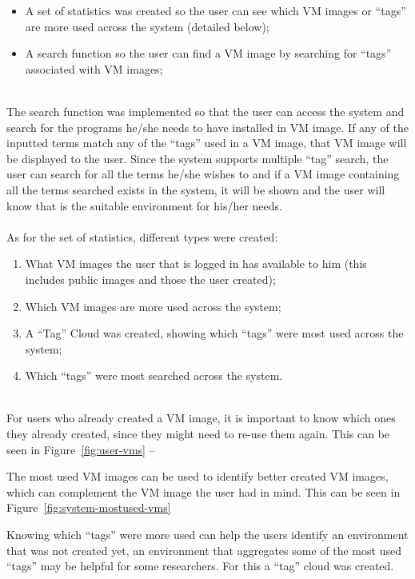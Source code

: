 \begin{itemize}
\item A set of statistics was created so the user can see which VM images or ``tags'' are more used across the system (detailed below);
\item A search function so the user can find a VM image by searching for ``tags'' associated with VM images;
\end{itemize}

\ \\
The search function was implemented so that the user can access the system and search for the programs he/she needs to have installed in VM image. If any of the inputted terms match any of the ``tags'' used in a VM image, that VM image will be displayed to the user. Since the system supports multiple ``tag'' search, the user can search for all the terms he/she wishes to and if a VM image containing all the terms searched exists in the system, it will be shown and the user will know that is the suitable environment for his/her needs.\\
\ \\
As for the set of statistics, different types were created:

\begin{enumerate}
\item What VM images the user that is logged in has available to him (this includes public images and those the user created);
\item Which VM images are more used across the system;
\item A ``Tag'' Cloud was created, showing which ``tags'' were most used across the system;
\item Which ``tags'' were most searched across the system.
\end{enumerate}

\ \\
For users who already created a VM image, it is important to know which ones they already created, since they might need to re-use them again.
This can be seen in Figure~\ref{fig:user-vms} --~

The most used VM images can be used to identify better created VM images, which can complement the VM image the user had in mind.
This can be seen in Figure~\ref{fig:system-mostused-vms}

Knowing which ``tags'' were more used can help the users identify an environment that was not created yet, an environment that aggregates some of the most used ``tags'' may be helpful for some researchers. For this a ``tag'' cloud was created.

